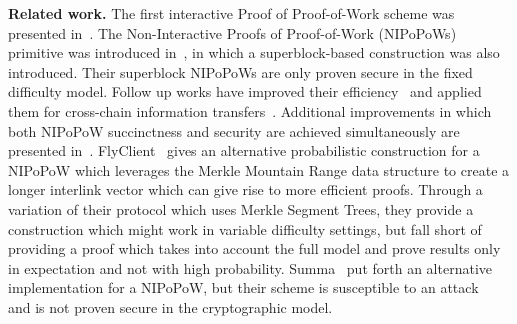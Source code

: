 \noindent
\textbf{Related work.}
The first interactive Proof of Proof-of-Work scheme was presented
in~\cite{popow}. The Non-Interactive Proofs of Proof-of-Work (NIPoPoWs)
primitive was introduced in~\cite{nipopow}, in which a superblock-based
construction was also introduced. Their superblock NIPoPoWs are only proven
secure in the fixed difficulty model. Follow up works have improved their
efficiency~\cite{superblocks} and applied them for cross-chain information
transfers~\cite{pow-sidechains}. Additional improvements in which both
NIPoPoW succinctness and security are achieved simultaneously are presented
in~\cite{logspace}.
FlyClient~\cite{flyclient} gives an alternative probabilistic construction for a
NIPoPoW which leverages the Merkle Mountain Range data structure to create a
longer interlink vector which can give rise to more efficient proofs.
Through a variation of their protocol which uses Merkle Segment Trees, they
provide a construction which might work in variable difficulty settings, but
fall short of providing a proof which takes into account the full model and
prove results only in expectation and not with high probability.
Summa~\cite{summa} put forth an alternative implementation for a NIPoPoW, but
their scheme is susceptible to an attack~\cite{summa-composability} and is not
proven secure in the cryptographic model.
